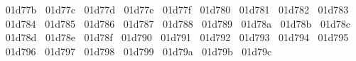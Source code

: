 {  ^^^^^^01d77b%
  ^^^^^^01d77c%
  ^^^^^^01d77d%
  ^^^^^^01d77e%
  ^^^^^^01d77f%
  ^^^^^^01d780%
  ^^^^^^01d781%
  ^^^^^^01d782%
  ^^^^^^01d783%
  ^^^^^^01d784%
  ^^^^^^01d785%
  ^^^^^^01d786%
  ^^^^^^01d787%
  ^^^^^^01d788%
  ^^^^^^01d789%
  ^^^^^^01d78a%
  ^^^^^^01d78b%
  ^^^^^^01d78c%
  ^^^^^^01d78d%
  ^^^^^^01d78e%
  ^^^^^^01d78f%
  ^^^^^^01d790%
  ^^^^^^01d791%
  ^^^^^^01d792%
  ^^^^^^01d793%
  ^^^^^^01d794%
  ^^^^^^01d795%
  ^^^^^^01d796%
  ^^^^^^01d797%
  ^^^^^^01d798%
  ^^^^^^01d799%
  ^^^^^^01d79a%
  ^^^^^^01d79b%
  ^^^^^^01d79c%
}
